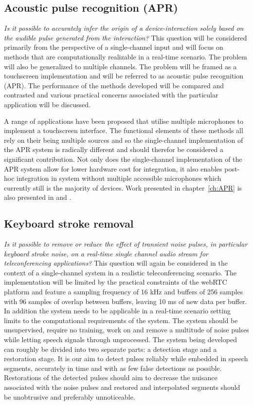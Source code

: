\subsection{Acoustic pulse recognition (APR)}
\emph{Is it possible to accurately infer the origin of a device-interaction solely based on the audible pulse generated from the interaction?} 
This question will be considered primarily from the perspective of a single-channel input and will focus on methods that are computationally realizable in a real-time scenario. The problem will also be generalized to multiple channels. The problem will be framed as a touchscreen implementation and will be referred to as acoustic pulse recognition (APR). The performance of the methods developed will be compared and contrasted and various practical concerns associated with the particular application will be discussed.

A range of applications have been proposed that utilise multiple microphones to implement a touchscreen interface\cite{US8174547}\cite{US8233353}\cite{TouchSystems2006}\cite{US7411581}\cite{WO2006108443}. The functional elements of these methods all rely on their being multiple sources and so the single-channel implementation of the APR system is radically different and should therefor be considered a significant contribution. Not only does the single-channel implementation of the APR system allow for lower hardware cost for integration, it also enables post-hoc integration in system without multiple accessible microphones which currently still is the majority of devices. Work presented in chapter~\ref{ch:APR} is also presented in \cite{Christensen2011} and \cite{US20110316784}.

\subsection{Keyboard stroke removal}
\emph{Is it possible to remove or reduce the effect of transient noise pulses, in particular keyboard stroke noise, on a real-time single channel audio stream for teleconferencing applications?}
This question will again be considered in the context of a single-channel system in a realistic teleconferencing scenario. The implementation will be limited by the practical constraints of the webRTC platform and feature a sampling frequency of 16 kHz and buffers of 256 samples with 96 samples of overlap between buffers, leaving 10 ms of new data per buffer. In addition the system needs to be applicable in a real-time scenario setting limits to the computational requirements of the system. The system should be unsupervised, require no training, work on and remove a multitude of noise pulses while letting speech signals through unprocessed. The system being developed can roughly be divided into two separate parts: a detection stage and a restoration stage. It is our aim to detect pulses reliably while embedded in speech segments, accurately in time and with as few false detections as possible. Restorations of the detected pulses should aim to decrease the nuisance associated with the noise pulses and restored and interpolated segments should be unobtrusive and preferably unnoticeable.

